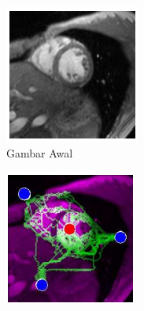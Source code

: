 \begin{figure}[H]
  \centering
    \begin{subfigure}{0.3\textwidth}
      \centering{}
      \includegraphics[width=\textwidth]{gambar/gambar-2.png}
      \caption{Gambar Awal}
    \end{subfigure}%
    \begin{subfigure}{0.3\textwidth}
      \centering{}
      \includegraphics[width=\textwidth]{gambar/gambar-2a.png}

\end{subfigure}
\end{figure}
